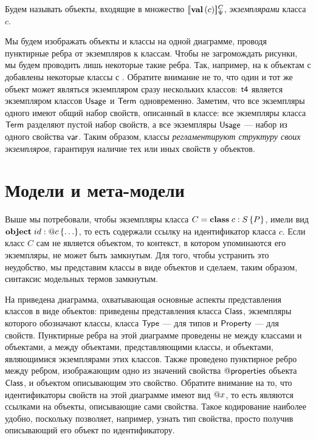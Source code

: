 \begin{Def}
Будем называть объекты, входящие в множество $[\![\mathbf{val}\left(c\right)]\!]_\Psi^C$, \emph{экземплярами} класса $c$.
\end{Def}

Мы будем изображать объекты и классы на одной диаграмме, проводя пунктирные ребра от экземпляров к классам. Чтобы не загромождать рисунки, мы будем проводить лишь некоторые такие ребра. Так, например, на  к объектам с  добавлены некоторые классы с .
%
%
%
Обратите внимание не то, что один и тот же объект может являться экземпляром сразу нескольких классов: $\mathsf{t4}$ является экземпляром классов $\mathsf{Usage}$ и $\mathsf{Term}$ одновременно. Заметим, что все экземпляры одного имеют общий набор свойств, описанный в классе: все экземпляры класса $\mathsf{Term}$ разделяют пустой набор свойств, а все экземпляры $\mathsf{Usage}$ --- набор из одного свойства $\mathsf{var}$. Таким образом, классы \emph{регламентируют структуру своих экземпляров}, гарантируя наличие тех или иных свойств у объектов.

\section{Модели и мета-модели}

Выше мы потребовали, чтобы экземпляры класса $C = \mathbf{class}\;c : S \left\{P\right\}$, имели вид $\mathbf{object}\;id : @c\left\{ \ldots \right\}$, то есть содержали ссылку на идентификатор класса $c$. Если класс $C$ сам не является объектом, то контекст, в котором упоминаются его экземпляры, не может быть замкнутым. Для того, чтобы устранить это неудобство, мы представим классы в виде объектов и сделаем, таким образом, синтаксис модельных термов замкнутым.

На  приведена диаграмма, охватывающая основные аспекты представления классов в виде объектов: приведены представления класса $\mathsf{Class}$, экземпляры которого обозначают классы, класса $\mathsf{Type}$ --- для типов и $\mathsf{Property}$ --- для свойств. Пунктирные ребра на этой диаграмме проведены не между классами и объектами, а между объектами, представляющими классы, и объектами, являющимися экземплярами этих классов. Также проведено пунктирное ребро между ребром, изображающим одно из значений свойства $@\mathsf{properties}$ объекта $\mathsf{Class}$, и объектом описывающим это свойство.
%
%
%
Обратите внимание на то, что идентификаторы свойств на этой диаграмме имеют вид $@x$, то есть являются ссылками на объекты, описывающие сами свойства. Такое кодирование наиболее удобно, поскольку позволяет, например, узнать тип свойства, просто получив описывающий его объект по идентификатору.

